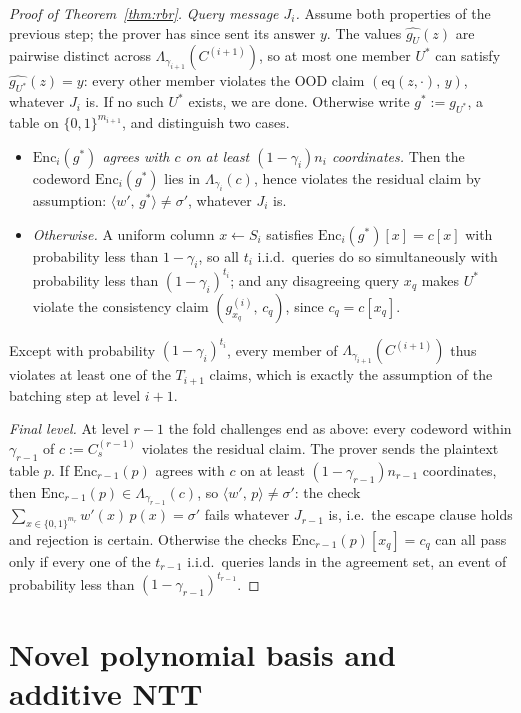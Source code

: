\documentclass[11pt]{article}
\newcommand{\eq}{\mathrm{eq}}
\newcommand{\Enc}{\mathrm{Enc}}
\newcommand{\Lam}{\Lambda}
\newcommand{\cube}[1]{\{0,1\}^{#1}}
\newcommand{\inner}[2]{\langle #1,\, #2 \rangle}
\newcommand{\pol}[1]{\widehat{#1}}
\theoremstyle{plain}
\theoremstyle{definition}
\theoremstyle{remark}
\begin{document}
\begin{proof}[Proof of Theorem~\ref{thm:rbr}]
\medskip\noindent\emph{Query message $J_i$.}
Assume both properties of the previous step; the prover has since sent its answer $y$. The values $\pol{g_U}(z)$ are pairwise distinct across $\Lam_{\gamma_{i+1}}(C^{(i+1)})$, so at most one member $U^\ast$ can satisfy $\pol{g_{U^\ast}}(z) = y$: every other member violates the OOD claim $(\eq(z, \cdot),\, y)$, whatever $J_i$ is. If no such $U^\ast$ exists, we are done. Otherwise write $g^\ast := g_{U^\ast}$, a table on $\cube{m_{i+1}}$, and distinguish two cases.
\begin{itemize}[itemsep=1pt]
\item \emph{$\Enc_i(g^\ast)$ agrees with $c$ on at least $(1 - \gamma_i) n_i$ coordinates.} Then the codeword $\Enc_i(g^\ast)$ lies in $\Lam_{\gamma_i}(c)$, hence violates the residual claim by assumption: $\inner{w'}{g^\ast} \neq \sigma'$, whatever $J_i$ is.
\item \emph{Otherwise.} A uniform column $x \leftarrow S_i$ satisfies $\Enc_i(g^\ast)[x] = c[x]$ with probability less than $1 - \gamma_i$, so all $t_i$ i.i.d.\ queries do so simultaneously with probability less than $(1 - \gamma_i)^{t_i}$; and any disagreeing query $x_q$ makes $U^\ast$ violate the consistency claim $(g^{(i)}_{x_q},\, c_q)$, since $c_q = c[x_q]$.
\end{itemize}
Except with probability $(1 - \gamma_i)^{t_i}$, every member of $\Lam_{\gamma_{i+1}}(C^{(i+1)})$ thus violates at least one of the $T_{i+1}$ claims, which is exactly the assumption of the batching step at level $i + 1$.

\medskip\noindent\emph{Final level.}
At level $r - 1$ the fold challenges end as above: every codeword within $\gamma_{r-1}$ of $c := C^{(r-1)}_s$ violates the residual claim. The prover sends the plaintext table $p$. If $\Enc_{r-1}(p)$ agrees with $c$ on at least $(1 - \gamma_{r-1}) n_{r-1}$ coordinates, then $\Enc_{r-1}(p) \in \Lam_{\gamma_{r-1}}(c)$, so $\inner{w'}{p} \neq \sigma'$: the check $\sum_{x \in \cube{m_r}} w'(x)\, p(x) = \sigma'$ fails whatever $J_{r-1}$ is, i.e.\ the escape clause holds and rejection is certain. Otherwise the checks $\Enc_{r-1}(p)[x_q] = c_q$ can all pass only if every one of the $t_{r-1}$ i.i.d.\ queries lands in the agreement set, an event of probability less than $(1 - \gamma_{r-1})^{t_{r-1}}$.

\end{proof}

\appendix

\section{Novel polynomial basis and additive NTT}\label{app:ntt}
\end{document}
